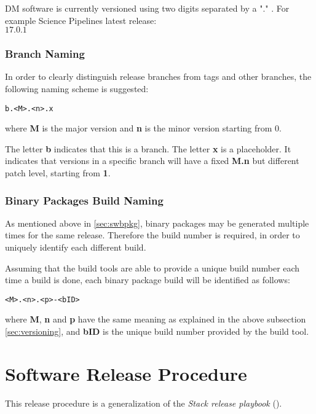 DM software is currently versioned using two digits separated by a "." .
For example Science Pipelines latest release:\\
$17.0.1$


\subsubsection{Branch Naming} \label{sec:branchnaming}

In order to clearly distinguish release branches from tags and other branches, the following naming scheme is suggested:

\begin{verbatim}
b.<M>.<n>.x
\end{verbatim}

where \textbf{M} is the major version and \textbf{n} is the minor version starting from 0.

The letter  \textbf{b} indicates that this is a branch.
The letter \textbf{x} is a placeholder. It indicates that versions in a specific branch will have a fixed \textbf{M.n} but different patch level, starting from \textbf{1}.

\subsubsection{Binary Packages Build Naming} \label{sec:binpkgname}

As mentioned above in \ref{sec:swbpkg}, binary packages may be generated multiple times for the same release.
Therefore the build number is required, in order to uniquely identify each different build.

Assuming that the build tools are able to provide a unique build number each time a build is done, 
each binary package build will be identified as follows:

\begin{verbatim}
<M>.<n>.<p>-<bID>
\end{verbatim}

where \textbf{M}, \textbf{n} and \textbf{p} have the same meaning as explained in the above subsection \ref{sec:versioning},
and \textbf{bID} is the unique build number provided by the build tool.


\newpage
\section{Software Release Procedure} \label{sec:releaseprocedure}

This release procedure is a generalization of the \textit{Stack release playbook} ().


